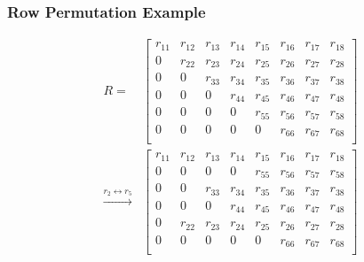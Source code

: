 \documentclass{beamer}
\begin{document}
\begin{frame}
    \frametitle{Row Permutation Example}
\begin{align*}
R =
  &\begin{bmatrix}
 r_{11} & r_{12} & r_{13} & r_{14} & r_{15} & r_{16} & r_{17} & r_{18}\\
 0      & r_{22} & r_{23} & r_{24} & r_{25} & r_{26} & r_{27} & r_{28}\\
 0      & 0      & r_{33} & r_{34} & r_{35} & r_{36} & r_{37} & r_{38}\\
 0      & 0      & 0      & r_{44} & r_{45} & r_{46} & r_{47} & r_{48}\\
 0      & 0      & 0      & 0      & r_{55} & r_{56} & r_{57} & r_{58}\\
 0      & 0      & 0      & 0      & 0      & r_{66} & r_{67} & r_{68}\\
\end{bmatrix}\\
\xrightarrow{r_{2} \leftrightarrow r_{5}}
&\begin{bmatrix}
 r_{11} & r_{12} & r_{13} & r_{14} & r_{15} & r_{16} & r_{17} & r_{18}\\
 0      & 0      & 0      & 0      & r_{55} & r_{56} & r_{57} & r_{58}\\
 0      & 0      & r_{33} & r_{34} & r_{35} & r_{36} & r_{37} & r_{38}\\
 0      & 0      & 0      & r_{44} & r_{45} & r_{46} & r_{47} & r_{48}\\
 0      & r_{22} & r_{23} & r_{24} & r_{25} & r_{26} & r_{27} & r_{28}\\
 0      & 0      & 0      & 0      & 0      & r_{66} & r_{67} & r_{68}\\
\end{bmatrix}
\end{align*}
\end{frame}
\end{document}
